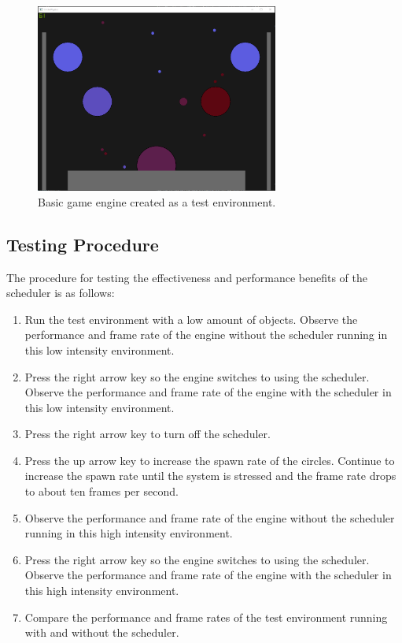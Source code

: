 \documentclass[a4paper, 12pt]{article}
\begin{document}
        \begin{figure}[H]
            \includegraphics[width=8cm]{engine.png}
            \centering
            \caption{Basic game engine created as a test environment.}
            \label{engine}
        \end{figure}

    \subsection{Testing Procedure}

    The procedure for testing the effectiveness and performance benefits of the scheduler is as follows:
    \begin{enumerate}
        \item{Run the test environment with a low amount of objects. Observe the performance and frame rate of the engine without the scheduler running in this low intensity environment.}
        \item{Press the right arrow key so the engine switches to using the scheduler. Observe the performance and frame rate of the engine with the scheduler in this low intensity environment.}
        \item{Press the right arrow key to turn off the scheduler.}
        \item{Press the up arrow key to increase the spawn rate of the circles. Continue to increase the spawn rate until the system is stressed and the frame rate drops to about ten frames per second.}
        \item{Observe the performance and frame rate of the engine without the scheduler running in this high intensity environment.}
        \item{Press the right arrow key so the engine switches to using the scheduler. Observe the performance and frame rate of the engine with the scheduler in this high intensity environment.}
        \item{Compare the performance and frame rates of the test environment running with and without the scheduler.}
    \end{enumerate}
\end{document}
